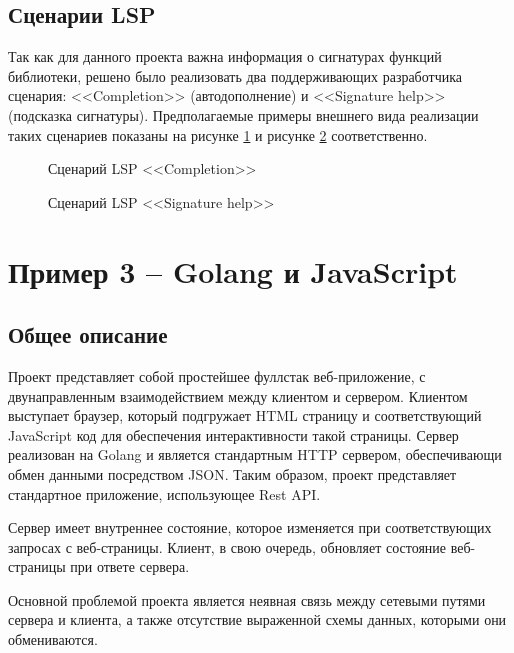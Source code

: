 \subsection{Сценарии LSP}

Так как для данного проекта важна информация о сигнатурах функций библиотеки, решено было реализовать два поддерживающих
разработчика сценария: <<Completion>> (автодополнение) и <<Signature help>> (подсказка сигнатуры).
Предполагаемые примеры внешнего вида реализации таких сценариев показаны на рисунке \ref{fig:lsp-autocomplete} и рисунке \ref{fig:lsp-signature}
соответственно.

\begin{figure}[H]
    \centering
    \caption{Сценарий LSP <<Completion>>}
    \label{fig:lsp-autocomplete}
\end{figure}

\begin{figure}[H]
    \centering
    \caption{Сценарий LSP <<Signature help>>}
    \label{fig:lsp-signature}
\end{figure}

\section{Пример 3 -- Golang и JavaScript}

\subsection{Общее описание}

Проект представляет собой простейшее фуллстак веб-приложение, с двунаправленным взаимодействием
между клиентом и сервером. Клиентом выступает браузер, который подгружает HTML страницу и соответствующий JavaScript
код для обеспечения интерактивности такой страницы. Сервер реализован на Golang и является стандартным
HTTP сервером, обеспечивающи обмен данными посредством JSON. Таким образом, проект представляет стандартное
приложение, использующее Rest API.

Сервер имеет внутреннее состояние, которое изменяется при соответствующих запросах с веб-страницы. Клиент, в свою
очередь, обновляет состояние веб-страницы при ответе сервера.

Основной проблемой проекта является неявная связь между сетевыми путями сервера и клиента, а также
отсутствие выраженной схемы данных, которыми они обмениваются.


